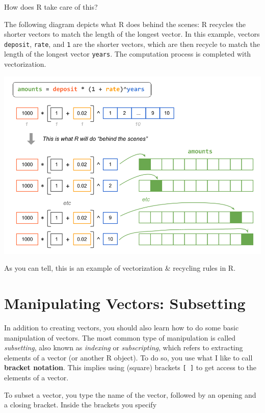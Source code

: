 \documentclass[
]{book}
\begin{document}
How does R take care of this?

The following diagram depicts what R does behind the scenes: R recycles the
shorter vectors to match the length of the longest vector. In this example,
vectors \texttt{deposit}, \texttt{rate}, and \texttt{1} are the shorter vectors, which are then
recycle to match the length of the longest vector \texttt{years}. The computation
process is completed with vectorization.

\begin{center}\includegraphics[width=0.9\linewidth]{images/vectors/vectorized2} \end{center}

As you can tell, this is an example of vectorization \& recycling rules in R.

\hypertarget{manipulating-vectors-subsetting}{%
\section{Manipulating Vectors: Subsetting}\label{manipulating-vectors-subsetting}}

In addition to creating vectors, you should also learn how to do some basic
manipulation of vectors. The most common type of manipulation is called
\emph{subsetting}, also known as \emph{indexing} or \emph{subscripting}, which refers to
extracting elements of a vector (or another R object). To do so, you use what
I like to call \textbf{bracket notation}. This implies using (square) brackets \texttt{{[}\ {]}}
to get access to the elements of a vector.

To subset a vector, you type the name of the vector, followed by an opening
and a closing bracket. Inside the brackets you specify
\end{document}
